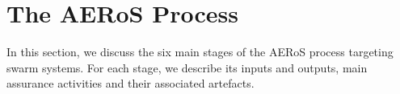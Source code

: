 \documentclass[runningheads]{llncs}
\begin{document}

\section{The AERoS Process}\label{framework}
In this section, we discuss the six main stages of the AERoS process targeting swarm systems. For each stage, we describe its inputs and outputs, main assurance activities and their associated artefacts.
%
\end{document}
